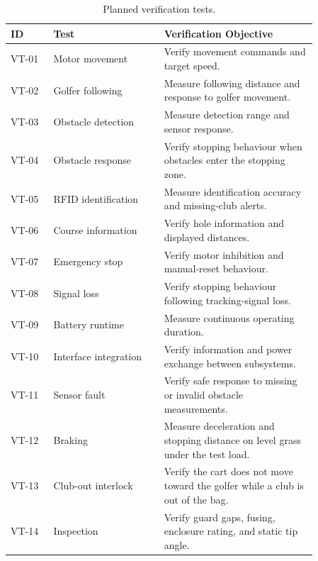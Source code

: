 \begin{table}[H]
\centering
\caption{Planned verification tests.}
\label{tab:app-verification}
\footnotesize
\begin{tabular}{p{0.12\linewidth} p{0.31\linewidth} p{0.43\linewidth}}
\hline
\textbf{ID} & \textbf{Test} & \textbf{Verification Objective} \\
\hline
VT-01 & Motor movement & Verify movement commands and target speed. \\
VT-02 & Golfer following & Measure following distance and response to golfer movement. \\
VT-03 & Obstacle detection & Measure detection range and sensor response. \\
VT-04 & Obstacle response & Verify stopping behaviour when obstacles enter the stopping zone. \\
VT-05 & RFID identification & Measure identification accuracy and missing-club alerts. \\
VT-06 & Course information & Verify hole information and displayed distances. \\
VT-07 & Emergency stop & Verify motor inhibition and manual-reset behaviour. \\
VT-08 & Signal loss & Verify stopping behaviour following tracking-signal loss. \\
VT-09 & Battery runtime & Measure continuous operating duration. \\
VT-10 & Interface integration & Verify information and power exchange between subsystems. \\
VT-11 & Sensor fault & Verify safe response to missing or invalid obstacle measurements. \\
VT-12 & Braking & Measure deceleration and stopping distance on level grass under the test load. \\
VT-13 & Club-out interlock & Verify the cart does not move toward the golfer while a club is out of the bag. \\
VT-14 & Inspection & Verify guard gaps, fusing, enclosure rating, and static tip angle. \\
\hline
\end{tabular}
\end{table}


